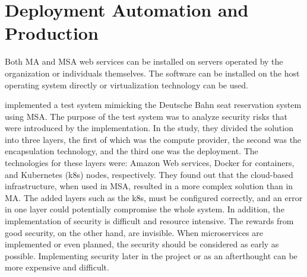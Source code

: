 
\section{Deployment Automation and Production}
\begin{sloppypar}
    Both MA and MSA web services can be installed on servers operated by the
    organization or individuals themselves. The software can be installed on the
    host operating system directly or virtualization technology can be used.
\end{sloppypar}
\begin{sloppypar}
    \citet{closer18} implemented a test system mimicking the Deutsche Bahn seat
    reservation system using MSA. The purpose of the test system was to analyze
    security risks that were introduced by the implementation. In the study,
    they divided the solution into three layers, the first of which was the
    compute provider, the second was the encapsulation technology, and the third
    one was the deployment. The technologies for these layers were: Amazon Web
    services, Docker for containers, and Kubernetes (k8s) nodes, respectively.
    They found out that the cloud-based infrastructure, when used in MSA,
    resulted in a more complex solution than in MA. The added layers such as the
    k8s, must be configured correctly, and an error in one layer could
    potentially compromise the whole system. In addition, the implementation of
    security is difficult and resource intensive. The rewards from good
    security, on the other hand, are invisible. When microservices are
    implemented or even planned, the security should be considered as early as
    possible. Implementing security later in the project or as an afterthought
    can be more expensive and difficult.
\end{sloppypar}

